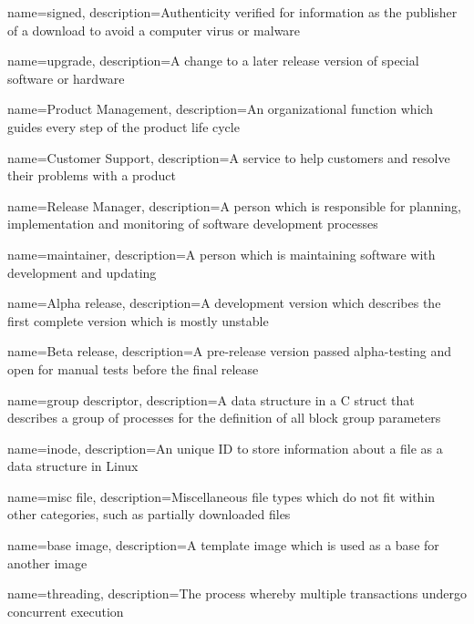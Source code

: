 {
    name={signed},
    description={Authenticity verified for information as the publisher of a download to avoid a computer virus or malware}
}

{
    name={upgrade},
    description={A change to a later release version of special software or hardware}
}

{
    name={Product Management},
    description={An organizational function which guides every step of the product life cycle}
}

{
    name={Customer Support},
    description={A service to help customers and resolve their problems with a product}
}

{
    name={Release Manager},
    description={A person which is responsible for planning, implementation and monitoring of software development processes}
}

{
    name={maintainer},
    description={A person which is maintaining software with development and updating}
}

{
    name={Alpha release},
    description={A development version which describes the first complete version which is mostly unstable}
}

{
    name={Beta release},
    description={A pre-release version passed alpha-testing and open for manual tests before the final release}
}

{
    name={group descriptor},
    description={A data structure in a C struct that describes a group of processes for the definition of all block group parameters}
}

{
    name={inode},
    description={An unique ID to store information about a file as a data structure in Linux}
}

{
    name={misc file},
    description={Miscellaneous file types which do not fit within other categories, such as partially downloaded files}
}

{
    name={base image},
    description={A template image which is used as a base for another image}
}

{
    name={threading},
    description={The process whereby multiple transactions undergo concurrent execution}
}

